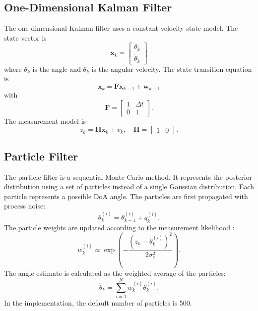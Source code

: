 \documentclass[conference]{IEEEtran}
\begin{document}
\subsection{One-Dimensional Kalman Filter}

The one-dimensional Kalman filter uses a constant velocity state model. The state vector is
\begin{equation}
    \mathbf{x}_k =
    \begin{bmatrix}
    \theta_k \\
    \dot{\theta}_k
    \end{bmatrix}
\end{equation}
where $\theta_k$ is the angle and $\dot{\theta}_k$ is the angular velocity. The state transition equation is
\begin{equation}
    \mathbf{x}_k = \mathbf{F}\mathbf{x}_{k-1} + \mathbf{w}_{k-1}
\end{equation}
with
\begin{equation}
    \mathbf{F} =
    \begin{bmatrix}
    1 & \Delta t \\
    0 & 1
    \end{bmatrix}.
\end{equation}
The measurement model is \cite{Hou2023BayesianDoA}
\begin{equation}
    z_k = \mathbf{H}\mathbf{x}_k + v_k, \quad
    \mathbf{H} = \begin{bmatrix} 1 & 0 \end{bmatrix}.
\end{equation}

\subsection{Particle Filter}

The particle filter is a sequential Monte Carlo method. It represents the posterior distribution using a set of particles instead of a single Gaussian distribution. Each particle represents a possible DoA angle. The particles are first propagated with process noise:
\begin{equation}
    \theta_k^{(i)} = \theta_{k-1}^{(i)} + q_k^{(i)}.
\end{equation}
The particle weights are updated according to the measurement likelihood \cite{Zocca2022PFWeight}:
\begin{equation}
    w_k^{(i)} \propto \exp\left(-\frac{(z_k-\theta_k^{(i)})^2}{2\sigma_z^2}\right).
\end{equation}
The angle estimate is calculated as the weighted average of the particles:
\begin{equation}
    \hat{\theta}_k = \sum_{i=1}^{N} w_k^{(i)}\theta_k^{(i)}.
\end{equation}
In the implementation, the default number of particles is 500.
\end{document}
